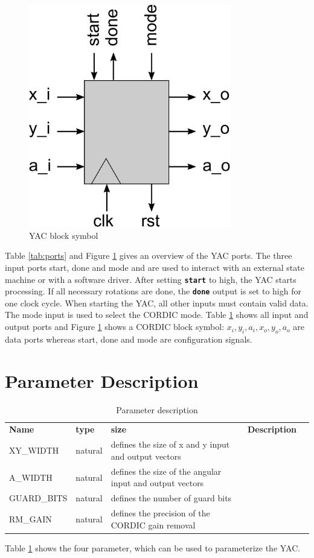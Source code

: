 \documentclass[a4paper, 12pt, notitlepage]{report}
\newcommand{\signal}[1]{{\textbf{\tt#1}}}
\begin{document}
\begin{figure}[p]
\centering
   \includegraphics[width=250pt]{figs/block_symbol.pdf}
   \caption{YAC block symbol}
   \label{fig:ports}
\end{figure}
Table \ref{tab:ports} and Figure \ref{fig:ports} gives an overview
of the YAC ports.
The three input ports start, done and mode and are used to interact
with an external state machine or with a software driver.
After setting \signal{start} to high, the YAC starts processing.
If all necessary rotations are done, the \signal{done} output is set to 
high for one clock cycle.
When starting the YAC, all other inputs must contain valid data.
The mode input is used to select the CORDIC mode.
Table \ref{fig:ports} shows all input and output ports and Figure 
\ref{fig:ports} shows a CORDIC block symbol: $x_i, y_i, a_i, x_o, y_o, a_o$
are data ports whereas start, done and mode are configuration signals.






\section{Parameter Description}
\begin{table}[htbp]
   \center
   \begin{tabular}{@{}lllll@{}}
      \rowcolor{tableheadcolor}\textbf{Name}& \textbf{type} & \textbf{size} & \textbf{Description} \\

      \multirow{1}{*}{XY\_WIDTH}    & natural  & defines the size of x and y input and output vectors \\\midrule
      \multirow{1}{*}{A\_WIDTH}     & natural  & defines the size of the angular input and output vectors \\\midrule
      \multirow{1}{*}{GUARD\_BITS}  & natural  & defines the number of guard bits \\\midrule
      \multirow{1}{*}{RM\_GAIN}     & natural  & defines the precision of the CORDIC gain removal \\\midrule
      \bottomrule
   \end{tabular}
   \caption{Parameter description}
   \label{tab:params}
\end{table} 
Table \ref{tab:params} shows the four parameter, which can be used to parameterize 
the YAC.
\end{document}
